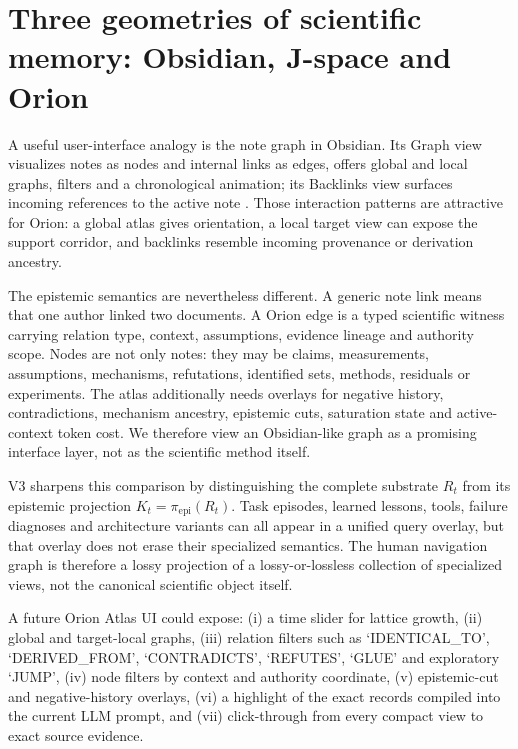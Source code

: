 \section{Three geometries of scientific memory: Obsidian, J-space and Orion}
A useful user-interface analogy is the note graph in Obsidian. Its Graph view visualizes notes as nodes and internal links as edges, offers global and local graphs, filters and a chronological animation; its Backlinks view surfaces incoming references to the active note \cite{obsidiangraph2026,obsidianbacklinks2026}. Those interaction patterns are attractive for Orion: a global atlas gives orientation, a local target view can expose the support corridor, and backlinks resemble incoming provenance or derivation ancestry.

The epistemic semantics are nevertheless different. A generic note link means that one author linked two documents. A Orion edge is a typed scientific witness carrying relation type, context, assumptions, evidence lineage and authority scope. Nodes are not only notes: they may be claims, measurements, assumptions, mechanisms, refutations, identified sets, methods, residuals or experiments. The atlas additionally needs overlays for negative history, contradictions, mechanism ancestry, epistemic cuts, saturation state and active-context token cost. We therefore view an Obsidian-like graph as a promising interface layer, not as the scientific method itself.


V3 sharpens this comparison by distinguishing the complete substrate $R_t$ from its epistemic projection $K_t=\pi_{\mathrm{epi}}(R_t)$. Task episodes, learned lessons, tools, failure diagnoses and architecture variants can all appear in a unified query overlay, but that overlay does not erase their specialized semantics. The human navigation graph is therefore a lossy projection of a lossy-or-lossless collection of specialized views, not the canonical scientific object itself.

A future Orion Atlas UI could expose: (i) a time slider for lattice growth, (ii) global and target-local graphs, (iii) relation filters such as `IDENTICAL\_TO', `DERIVED\_FROM', `CONTRADICTS', `REFUTES', `GLUE' and exploratory `JUMP', (iv) node filters by context and authority coordinate, (v) epistemic-cut and negative-history overlays, (vi) a highlight of the exact records compiled into the current LLM prompt, and (vii) click-through from every compact view to exact source evidence.

